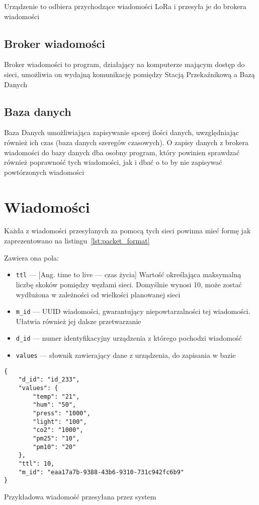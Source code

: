 Urządzenie to odbiera przychodzące wiadomości LoRa i przesyła je do brokera wiadomości

\subsection{Broker wiadomości}
Broker wiadomości to program, działający na komputerze mającym dostęp do sieci, umożliwia on wydajną komunikację pomiędzy Stacją Przekaźnikową a Bazą Danych

\subsection{Baza danych}
Baza Danych umożliwiająca zapisywanie sporej ilości danych, uwzględniając również ich czas (baza danych szeregów czasowych).
O zapisy danych z brokera wiadomości do bazy danych dba osobny program, który powinien sprawdzać również poprawność tych wiadomości, jak i dbać o to by nie zapisywać powtórzonych wiadomości

\section{Wiadomości}
Każda z wiadomości przesyłanych za pomocą tych sieci powinna mieć formę jak zaprezentowano na listingu~\ref{lst:packet_format}

Zawiera ona pola:
\begin{itemize}
    \item \texttt{ttl} — [Ang. time to live — czas życia] Wartość określająca maksymalną liczbę skoków pomiędzy węzłami sieci. Domyślnie wynosi 10, może zostać wydłużona w zależności od wielkości planowanej sieci
    \item \texttt{m\_id} — UUID \cite{RFC:uuid} wiadomości, gwarantujący niepowtarzalności tej wiadomości. Ułatwia również jej dalsze przetwarzanie
    \item \texttt{d\_id} — numer identyfikacyjny urządzenia z którego pochodzi wiadomość
    \item \texttt{values} — słownik zawierający dane z urządzenia, do zapisania w bazie
\end{itemize}

\begin{lstfloat}[b]
    \lstset{language=JavaScript}
    \begin{lstlisting}[frame=single]
{
    "d_id": "id_233",
    "values": {
        "temp": "21",
        "hum": "50",
        "press": "1000",
        "light": "100",
        "co2": "1000",
        "pm25": "10",
        "pm10": "20"
    },
    "ttl": 10,
    "m_id": "eaa17a7b-9388-43b6-9310-731c942fc6b9"
}          
\end{lstlisting}
    \caption{Przykładowa wiadomość przesyłana przez system}\label{lst:packet_format}
\end{lstfloat}

